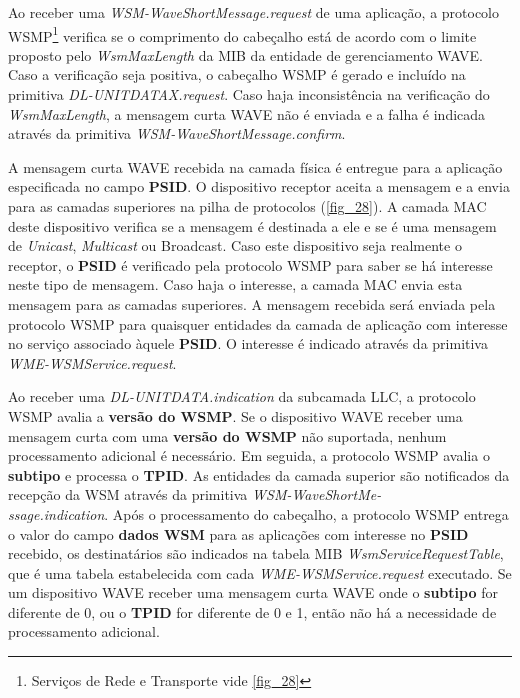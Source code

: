 \documentclass[
12pt,				%
openright,			%
oneside,			%
a4paper,			%
brazil,				%
]{abntex2}
\begin{document}
	\par Ao receber uma \textit{WSM-WaveShortMessage.request} de uma aplicação, a protocolo WSMP{\footnote{Serviços de Rede e Transporte vide \autoref{fig_28}}} verifica se o comprimento do cabeçalho está de acordo com o limite proposto pelo \textit{WsmMaxLength} da MIB da entidade de gerenciamento WAVE. Caso a verificação seja positiva, o cabeçalho WSMP é gerado e incluído na primitiva \textit{DL-UNITDATAX.request}. Caso haja inconsistência na verificação do \textit{WsmMaxLength}, a mensagem curta WAVE não é enviada e a falha é indicada através da primitiva \textit{WSM-WaveShortMessage.confirm}.

	\par A mensagem curta WAVE recebida na camada física é entregue para a aplicação especificada no campo \textbf{PSID}. O dispositivo receptor aceita a mensagem e a envia para as camadas superiores na pilha de protocolos (\autoref{fig_28}). A camada MAC deste dispositivo verifica se a mensagem é destinada a ele e se é uma mensagem de \textit{Unicast}, \textit{Multicast} ou Broadcast. Caso este dispositivo seja realmente o receptor, o \textbf{PSID} é verificado pela protocolo WSMP para saber se há interesse neste tipo de mensagem. Caso haja o interesse, a camada MAC envia esta mensagem para as camadas superiores. A mensagem recebida será enviada pela protocolo WSMP para quaisquer entidades da camada de aplicação com interesse no serviço associado àquele \textbf{PSID}. O interesse é indicado através da primitiva \textit{WME-WSMService.request}.

	\par Ao receber uma \textit{DL-UNITDATA.indication} da subcamada LLC, a protocolo WSMP avalia a \textbf{versão do WSMP}. Se o dispositivo WAVE receber uma mensagem curta com uma \textbf{versão do WSMP} não suportada, nenhum processamento adicional é necessário. Em seguida, a protocolo WSMP avalia o \textbf{subtipo} e processa o \textbf{TPID}. As entidades da camada superior são notificados da recepção da WSM através da primitiva \textit{WSM-WaveShortMe-\\ssage.indication}. Após o processamento do cabeçalho, a protocolo WSMP entrega o valor do campo \textbf{dados WSM} para as aplicações com interesse no \textbf{PSID} recebido, os destinatários são indicados na tabela MIB \textit{WsmServiceRequestTable}, que é uma tabela estabelecida com cada \textit{WME-WSMService.request} executado. Se um dispositivo WAVE receber uma mensagem curta WAVE onde o \textbf{subtipo} for diferente de 0, ou o \textbf{TPID} for diferente de 0 e 1, então não há a necessidade de processamento adicional. 
\end{document}
